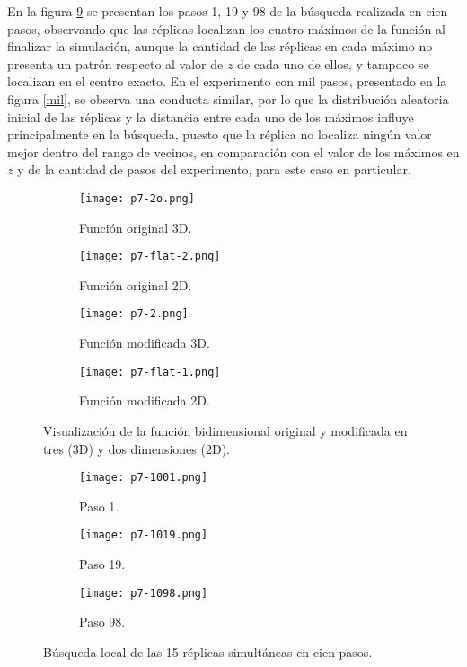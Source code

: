 \documentclass{article}
\begin{document}
En la figura \ref{cien} se presentan los pasos 1, 19 y 98 de la búsqueda realizada en cien pasos, observando que las réplicas localizan los cuatro máximos de la función al finalizar la simulación, aunque la cantidad de las réplicas en cada máximo no presenta un patrón respecto al valor de $z$ de cada uno de ellos, y tampoco se localizan en el centro exacto. En el experimento con mil pasos, presentado en la figura \ref{mil}, se observa una conducta similar, por lo que la distribución aleatoria inicial de las réplicas y la distancia entre cada uno de los máximos influye principalmente en la búsqueda, puesto que la réplica no localiza ningún valor mejor dentro del rango de vecinos, en comparación con el valor de los máximos en $z$ y de la cantidad de pasos del experimento, para este caso en particular.

\begin{figure}
\centering
\begin{subfigure}[b]{0.4\linewidth}
\texttt{[image: p7-2o.png]}
\caption{Función original 3D.}
\label{f1}
\end{subfigure}
\begin{subfigure}[b]{0.4\linewidth}
\texttt{[image: p7-flat-2.png]}
\caption{Función original 2D.}
\label{f1d}
\end{subfigure}
\begin{subfigure}[b]{0.4\linewidth}
\texttt{[image: p7-2.png]}
\caption{Función modificada 3D.}
\label{f2}
\end{subfigure}
\begin{subfigure}[b]{0.4\linewidth}
\texttt{[image: p7-flat-1.png]}
\caption{Función modificada 2D.}
\label{f2d}
\end{subfigure}
\caption{Visualización de la función bidimensional original y modificada en tres (3D) y dos dimensiones (2D).}
\label{visual}
\end{figure}

\begin{figure}
\centering
\begin{subfigure}[b]{0.4\linewidth}
\texttt{[image: p7-1001.png]}
\caption{Paso 1.}
\label{f1}
\end{subfigure}
\begin{subfigure}[b]{0.4\linewidth}
\texttt{[image: p7-1019.png]}
\caption{Paso 19.}
\label{f1d}
\end{subfigure}
\begin{subfigure}[b]{0.4\linewidth}
\texttt{[image: p7-1098.png]}
\caption{Paso 98.}
\label{f2d}
\end{subfigure}
\caption{Búsqueda local de las 15 réplicas simultáneas en cien pasos.}
\label{cien}
\end{figure}
\end{document}
